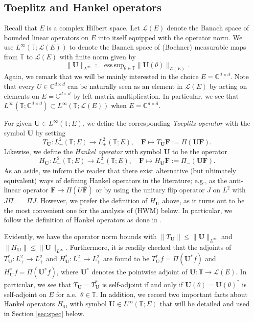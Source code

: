 \documentclass[10pt,reqno,a4paper]{amsart}
\theoremstyle{definition}
\theoremstyle{remark}
\theoremstyle{remark}
\numberwithin{equation}{section}
\newcommand{\C}{\mathbb{C}}
\newcommand{\T}{\mathbb{T}}
\newcommand{\ov}{\overline}
\newcommand{\Ub}{\mathbf{U}}
\newcommand{\Fb}{\mathbf{F}}
\newcommand{\Ls}{\mathscr{L}}
\begin{document}
\subsection{Toeplitz and Hankel operators} Recall that $E$ is a complex Hilbert space. Let $\Ls(E)$ denote the Banach space of bounded linear operators on $E$ into itself equipped with the operator norm. We use $L^\infty(\T; \Ls(E))$ to denote the Banach space of (Bochner) measurable maps from $\T$ to $\Ls(E)$ with finite norm given by
$$
\| \Ub \|_{L^\infty} := \mathrm{ess \, sup}_{\theta \in \T} \| \Ub(\theta) \|_{\Ls(E)}.
$$
Again, we remark that we will be mainly interested in the choice $E = \C^{d \times d}$. Note that every  $U \in \C^{d \times d}$ can be naturally seen as an element in $\Ls(E)$ by acting on  elements on $E=\C^{d \times d}$ by left matrix multiplication. In particular, we see that $L^\infty(\T; \C^{d \times d}) \subset L^\infty(\T; \Ls(E))$ when $E=\C^{d \times d}$.
 
For given $\Ub \in L^\infty(\T; E)$, we define the corresponding {\em Toeplitz operator} with the symbol $\Ub$ by setting
$$
T_{\Ub} : L^2_+(\T;E) \to L^2_+(\T;E), \quad \Fb \mapsto T_\Ub \Fb := \Pi(\Ub \Fb). 
$$  
Likewise, we define the {\em Hankel operator} with symbol $\Ub$ to be the operator
$$
H_{\Ub} : L^2_+(\T; E) \to L^2_-(\T;E), \quad \Fb \mapsto H_{\Ub} \Fb := \Pi_-(\Ub \Fb).
$$
As an aside, we inform the reader that there exist alternative (but ultimately equivalent) ways of defining Hankel operators in the literature; e.g., as the anti-linear operator $\Fb \mapsto \Pi(U \ov{\Fb})$ or by using the unitary flip operator $J$ on $L^2$ with $J \Pi_- = \Pi J$. However, we prefer the definition of $H_\Ub$ above, as it turns out to be the most convenient one for the analysis of (HWM) below. In particular, we follow the definition of Hankel operators as done in \cite{Pe-03}.

Evidently, we have the operator norm bounds  with  $\| T_{\Ub} \| \leq \| \Ub \|_{L^\infty}$ and $\|H_{\Ub} \| \leq \|  \Ub \|_{L^\infty}$. Furthermore, it is readily checked that the adjoints of $T_{\Ub}^* : L^2_+ \to L^2_+$ and $H_{\Ub}^* : L^2_- \to L^2_+$ are found to be $T_\Ub^* f= \Pi (\Ub^* f)$ and $H_{\Ub}^* f = \Pi(\Ub^* f)$, where $\Ub^*$ denotes the pointwise adjoint of $\Ub : \T \to \Ls(E)$. In particular, we see that $T_{\Ub} = T_\Ub^*$ is self-adjoint if and only if $\Ub(\theta) = \Ub(\theta)^*$ is self-adjoint on $E$ for a.e.~$\theta \in \T$. In addition, we record two important facts about Hankel operators $H_\Ub$ with symbol $\Ub \in L^\infty(\T; E)$ that will be detailed and used in Section \ref{sec:spec} below.
\end{document}
